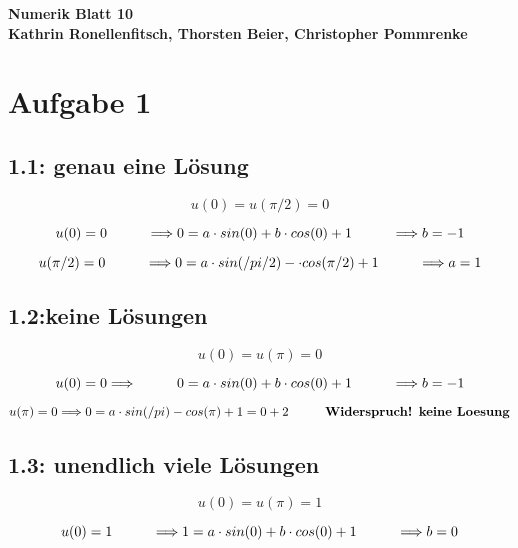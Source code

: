 \documentclass[10pt,oneside,a4paper]{scrartcl}
\begin{document}
    \begin{center}
        \huge %
        \bfseries %
        \sffamily %
        Numerik Blatt 10\\[1em]
        \normalsize
        Kathrin Ronellenfitsch, Thorsten Beier, Christopher Pommrenke
    \end{center}

    \section*{Aufgabe 1}
    \subsection*{1.1: genau eine Lösung }
    \[
    u(0)=u(\pi/2)=0 
    \]
    
    \[
    u(0)=0 \hspace*{1cm} \Longrightarrow 0=a \cdot sin(0) + b \cdot cos(0) +1  \hspace*{1cm} \Longrightarrow b=-1
    \]
    
    \[
    u(\pi/2)=0 \hspace*{1cm} \Longrightarrow 0=a \cdot sin(/pi/2) -  \cdot cos(\pi/2) +1 \hspace*{1cm} \Longrightarrow a=1
    \]
    
    \subsection*{1.2:keine Lösungen }
    \[
    u(0)=u(\pi)=0 
    \]
    
    \[
    u(0)=0 \Longrightarrow \hspace*{1cm}  0=a \cdot sin(0) + b \cdot cos(0) +1  \hspace*{1cm} \Longrightarrow b=-1
    \]
    
    \[
    u(\pi)=0 \Longrightarrow 0=a \cdot sin(/pi) -  cos(\pi) +1 =0+2 \hspace*{1cm} \textbf{Widerspruch! keine Loesung}
    \]
    
    \subsection*{1.3: unendlich viele Lösungen }
    \[
    u(0)=u(\pi)=1 
    \]
    
    \[
    u(0)=1 \hspace*{1cm}  \Longrightarrow 1=a \cdot sin(0) + b \cdot cos(0) +1  \hspace*{1cm} \Longrightarrow b=0
    \]
    
\end{document}
